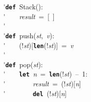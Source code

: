 \'\>\texttt{\textbf{def}}~Stack():\\

\'\>~~~~\textit{result}~=~[~]\\

\'\>\\

\'\>\texttt{\textbf{def}}~push(\textit{st},~\textit{v}):\\

\'\>~~~~(!\textit{st})[\texttt{\textbf{len}}(!\textit{st})]~=~\textit{v}\\

\'\>\\

\'\>\texttt{\textbf{def}}~pop(\textit{st}):\\

\'\>~~~~\texttt{\textbf{let}}~\textit{n}~=~\texttt{\textbf{len}}(!\textit{st})~--~1:\\

\'\>~~~~~~~~\textit{result}~=~(!\textit{st})[\textit{n}]\\

\'\>~~~~~~~~\texttt{\textbf{del}}~(!\textit{st})[\textit{n}]